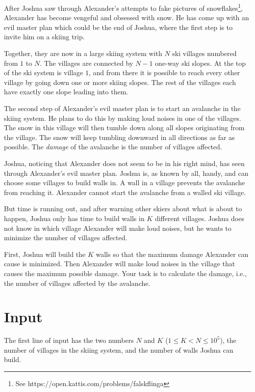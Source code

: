 
\noindent
After Joshua saw through Alexander's attempts to fake pictures of snowflakes\footnote{See https://open.kattis.com/problems/falskflinga}, 
Alexander has become vengeful and obsessed with snow. 
He has come up with an evil master plan which could be the end of Joshua, 
where the first step is to invite him on a skiing trip. 

Together, they are now in a large skiing system with $N$ ski villages numbered from $1$ to $N$. 
The villages are connected by $N-1$ one-way ski slopes. 
At the top of the ski system is village $1$, and from there
it is possible to reach every other village by going down
one or more skiing slopes.
The rest of the villages each have exactly one slope leading into them.

The second step of Alexander's evil master plan
is to start an avalanche in the skiing system. 
He plans to do this by making loud noises in one of the villages.
The snow in this village will then tumble down along all slopes originating from the village. 
The snow will keep tumbling downward in all directions as far as possible. 
The \emph{damage} of the avalanche is the number of villages affected.

Joshua, noticing that Alexander does not seem to be in his right mind, 
has seen through Alexander's evil master plan. 
Joshua is, as known by all, handy, and can choose some villages to build walls in. 
A wall in a village prevents the avalanche from reaching it. 
Alexander cannot start the avalanche from a walled ski village.

But time is running out, 
and after warning other skiers about what is about to happen, 
Joshua only has time to build walls in $K$ different villages. 
Joshua does not know in which village Alexander will make loud noises,
but he wants to minimize the number of villages affected.

First, Joshua will build the $K$ walls so that the maximum damage Alexander can cause is minimized. 
Then Alexander will make loud noises in the village that causes the maximum possible damage. 
Your task is to calculate the damage, i.e., the number of villages affected by the avalanche.

\section*{Input}
The first line of input has the two numbers $N$ and $K$ ($1 \le K < N \le 10^5$),
the number of villages in the skiing system, and the number of walls Joshua can build.

